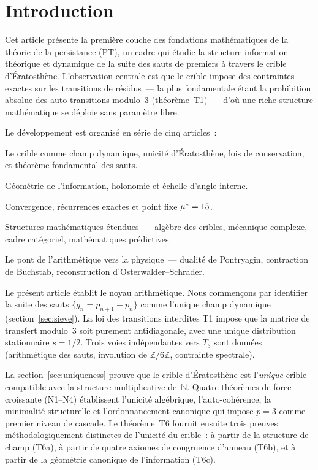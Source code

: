 \documentclass[12pt,a4paper]{article}
\begin{document}
\tableofcontents
\newpage

\section{Introduction}
\label{sec:intro}

Cet article présente la première couche des fondations mathématiques
de la théorie de la persistance (PT), un cadre qui étudie la
structure information-théorique et dynamique de la suite des sauts
de premiers à travers le crible d'Ératosthène. L'observation centrale
est que le crible impose des contraintes exactes sur les transitions
de résidus~--- la plus fondamentale étant la prohibition absolue des
auto-transitions modulo~3 (théorème~T1)~--- d'où une riche structure
mathématique se déploie sans paramètre libre.

Le développement est organisé en série de cinq articles~:
\begin{description}[nosep]
\item[M1 (cet article)~:] Le crible comme champ dynamique, unicité
  d'Ératosthène, lois de conservation, et théorème fondamental des
  sauts.
\item[M2~:] Géométrie de l'information, holonomie et échelle d'angle
  interne.
\item[M3~:] Convergence, récurrences exactes et point fixe
  ${\mu^{*}} = 15$.
\item[M4~:] Structures mathématiques étendues~--- algèbre des cribles,
  mécanique complexe, cadre catégoriel, mathématiques prédictives.
\item[M5~:] Le pont de l'arithmétique vers la physique~--- dualité de
  Pontryagin, contraction de Buchstab, reconstruction
  d'Osterwalder--Schrader.
\end{description}

Le présent article établit le noyau arithmétique. Nous commençons par
identifier la suite des sauts $\{g_n = p_{n+1} - p_n\}$ comme l'unique
champ dynamique (section~\ref{sec:sieve}). La loi des transitions
interdites T1 impose que la matrice de transfert modulo~3 soit
purement antidiagonale, avec une unique distribution stationnaire
$s = 1/2$. Trois voies indépendantes vers $T_3$ sont données
(arithmétique des sauts, involution de $\mathbb{Z}/6\mathbb{Z}$,
contrainte spectrale).

La section~\ref{sec:uniqueness} prouve que le crible d'Ératosthène est
l'\emph{unique} crible compatible avec la structure multiplicative
de~$\mathbb{N}$. Quatre théorèmes de force croissante (N1--N4)
établissent l'unicité algébrique, l'auto-cohérence, la minimalité
structurelle et l'ordonnancement canonique qui impose $p = 3$ comme
premier niveau de cascade. Le théorème~T6 fournit ensuite trois
preuves méthodologiquement distinctes de l'unicité du crible~: à
partir de la structure de champ (T6a), à partir de quatre axiomes de
congruence d'anneau (T6b), et à partir de la géométrie canonique de
l'information (T6c).
\end{document}

